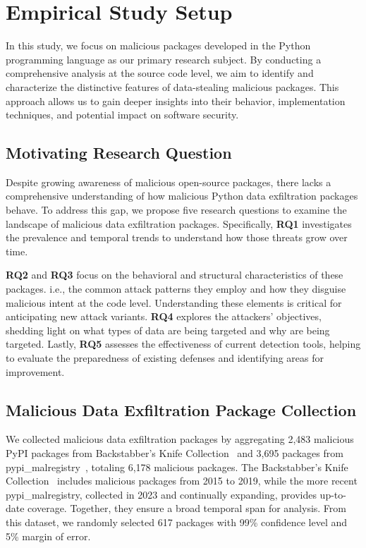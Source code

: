 
\section{Empirical Study Setup}\label{approach}

In this study, we focus on malicious packages developed in the Python programming language as our primary research subject. By conducting a comprehensive analysis at the source code level, we aim to identify and characterize the distinctive features of data-stealing malicious packages. This approach allows us to gain deeper insights into their behavior, implementation techniques, and potential impact on software security.  


\subsection{Motivating Research Question}



Despite growing awareness of malicious open-source packages, there lacks a comprehensive understanding of how malicious Python data exfiltration packages behave. To address this gap, we propose five research questions to examine the landscape of malicious data exfiltration packages. Specifically, \textbf{RQ1} investigates the prevalence and temporal trends to understand how those threats grow over time. 

\textbf{RQ2} and \textbf{RQ3} focus on the behavioral and structural characteristics of these packages. i.e., the common attack patterns they employ and how they disguise malicious intent at the code level. Understanding these elements is critical for anticipating new attack variants. \textbf{RQ4} explores the attackers' objectives, shedding light on what types of data are being targeted and why are being targeted. Lastly, \textbf{RQ5} assesses the effectiveness of current detection tools, helping to evaluate the preparedness of existing defenses and identifying areas for improvement. 

\subsection{Malicious Data Exfiltration Package Collection}

We collected malicious data exfiltration packages by aggregating 2,483 malicious PyPI packages from Backstabber's Knife Collection~\cite{ohm2020backstabber} and 3,695 packages from pypi\_malregistry~\cite{guo2023empirical}, totaling 6,178 malicious packages. The Backstabber's Knife Collection~\cite{ohm2020backstabber} includes malicious packages from 2015 to 2019, while the more recent pypi\_malregistry, collected in 2023 and continually expanding, provides up-to-date coverage. Together, they ensure a broad temporal span for analysis. From this dataset, we randomly selected 617 packages with 99\% confidence level and 5\% margin of error.

